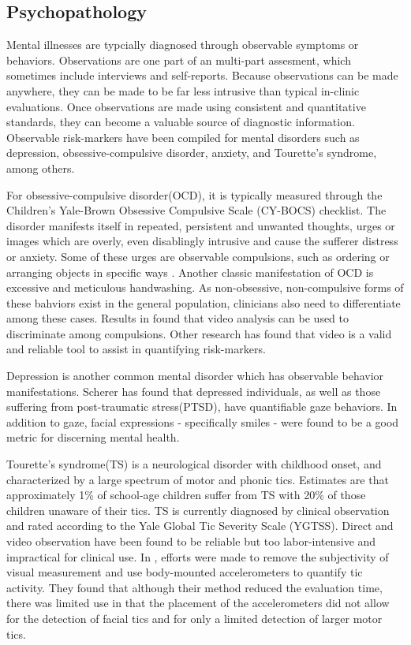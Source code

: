 \documentclass[11pt]{article}
\newcounter{list}
\begin{document}
\subsection{Psychopathology}
Mental illnesses are typcially diagnosed through observable symptoms or behaviors. Observations are one part of an multi-part assesment, which sometimes include interviews and self-reports. Because observations can be made anywhere, they can be made to be far less intrusive than typical in-clinic evaluations. Once observations are made using consistent and quantitative standards, they can become a valuable source of diagnostic information. Observable risk-markers have been compiled for mental disorders such as depression, obsessive-compulsive disorder, anxiety, and Tourette's syndrome, among others.

For obsessive-compulsive disorder(OCD), it is typically measured through the Children's Yale-Brown Obsessive Compulsive Scale (CY-BOCS) checklist. The disorder manifests itself in repeated, persistent and unwanted thoughts, urges or images which are overly, even disablingly intrusive and cause the sufferer distress or anxiety. Some of these urges are observable compulsions, such as ordering or arranging objects in specific ways \cite{radomsky2004}. Another classic manifestation of OCD is excessive and meticulous handwashing. As non-obsessive, non-compulsive forms of these bahviors exist in the general population, clinicians also need to differentiate among these cases.  Results in \cite{zor2011} found that  video analysis can be used to discriminate among compulsions. Other research \cite{bernstein2017} has found that video is a valid and reliable tool to assist in  quantifying risk-markers.

Depression is another common mental disorder which has observable behavior manifestations. Scherer \cite{scherer2014} has found that depressed individuals, as well as those suffering from post-traumatic stress(PTSD), have quantifiable gaze behaviors. In addition to gaze, facial expressions - specifically smiles - were found to be a good metric for discerning mental health.

Tourette's syndrome(TS) is a neurological disorder with childhood onset, and characterized by a large spectrum of motor and phonic tics. Estimates are that approximately 1\% of school-age children suffer from TS with 20\% of those children unaware of their tics. TS is currently diagnosed by clinical observation and rated according to the Yale Global Tic Severity Scale (YGTSS). Direct and video observation have been found to be reliable \cite{walkup1992} but too labor-intensive and impractical for clinical use. In \cite{bernabei2010}, efforts were made to remove the subjectivity of visual measurement and use  body-mounted accelerometers to quantify tic activity. They found that although their method reduced the evaluation time, there was limited use in that the placement of the accelerometers did not allow for the detection of facial tics and for only a limited detection of larger motor tics.
\end{document}
